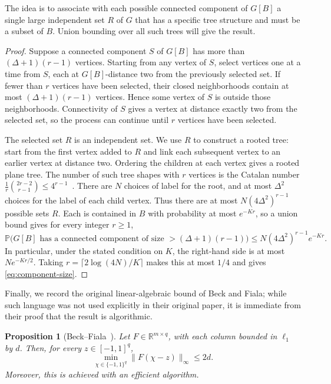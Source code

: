 \documentclass[10pt,a4paper]{amsart}
\newtheorem{proposition}[theorem]{Proposition}
\newcommand{\R}{\mathbb R}
\newcommand{\Prob}{\mathbb P}
\newcommand{\norm}[1]{\lVert#1\rVert}
\begin{document}
The idea is to associate with each possible connected component of $G[B]$ a single large independent set $R$ of $G$ that has a specific tree structure and must be a subset of $B$. Union bounding over all such trees will give the result.


\begin{proof}
Suppose a connected component $S$ of $G[B]$ has more than $(\Delta+1)(r-1)$ vertices. Starting from any vertex of $S$, select vertices one at a time from $S$, each at $G[B]$-distance two from the previously selected set. If fewer than $r$ vertices have been selected, their closed neighborhoods contain at most $(\Delta+1)(r-1)$ vertices. Hence some vertex of $S$ is outside those neighborhoods. Connectivity of $S$ gives a vertex at distance exactly two from the selected set, so the process can continue until $r$ vertices have been selected.

The selected set $R$ is an independent set. We use $R$ to construct a rooted tree: start from the first vertex added to $R$ and link each subsequent vertex to an earlier vertex at distance two. Ordering the children at each vertex gives a rooted plane tree. The number of such tree shapes with $r$ vertices is the Catalan number $\frac1r\binom{2r-2}{r-1}\le4^{r-1}$~\cite{StanleyEC2}. There are $N$ choices of label for the root, and at most $\Delta^2$ choices for the label of each child vertex. Thus there are at most $N(4\Delta^2)^{r-1}$ possible sets $R$. Each is contained in $B$ with probability at most $e^{-Kr}$, so a union bound gives for every integer $r\ge1$,
\begin{equation}\label{eq:component-probability} \Prob\bigl(G[B]\text{ has a connected component of size } >(\Delta+1)(r-1)\bigr) \le N(4\Delta^2)^{r-1}e^{-Kr}. \end{equation}
In particular, under the stated condition on $K$, the right-hand side is at most $Ne^{-Kr/2}$. Taking $r=\lceil2\log(4N)/K\rceil$ makes this at most $1/4$ and gives \eqref{eq:component-size}.
\end{proof}

Finally, we record the original linear-algebraic bound of Beck and Fiala; while such language was not used explicitly in their original paper, it is immediate from their proof that the result is algorithmic.

\begin{proposition}[Beck--Fiala~\cite{BF}]
Let $F\in \R^{m\times q}$, with each column bounded in $\ell_1$ by $d$. Then, for every $z\in[-1,1]^q$,
\begin{equation}\label{eq:linear} \min_{\chi\in\{-1,1\}^q} \norm{F(\chi-z)}_\infty \le 2d. \end{equation}
Moreover, this is achieved with an efficient algorithm.
\end{proposition}
\end{document}

